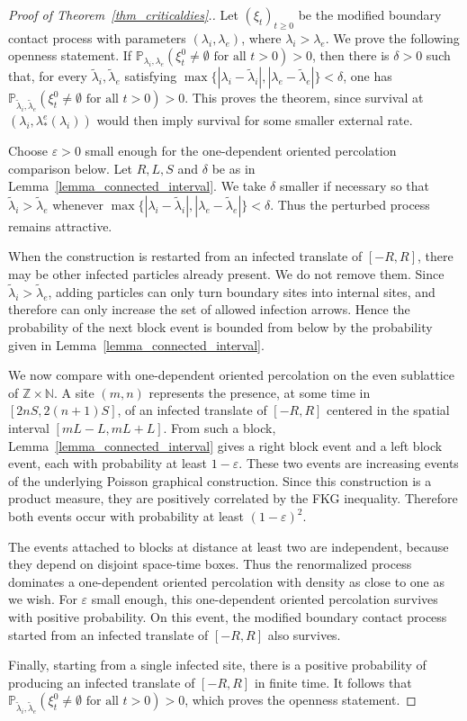 \documentclass[11pt,a4paper]{article}
\theoremstyle{plain}
\theoremstyle{definition}
\theoremstyle{remark}
\numberwithin{equation}{section}
\begin{document}
	\begin{proof}[Proof of Theorem~\ref{thm_criticaldies}.]
		Let $(\xi_t)_{t\geq0}$ be the modified boundary contact process with parameters $(\lambda_i,\lambda_e)$, where $\lambda_i>\lambda_e$. We prove the following openness statement. If $\mathbb{P}_{\lambda_i,\lambda_e}(\xi^0_t\neq\emptyset \text{ for all }t>0)>0$, then there is $\delta>0$ such that, for every $\tilde\lambda_i,\tilde\lambda_e$ satisfying $\max\{|\lambda_i-\tilde\lambda_i|,|\lambda_e-\tilde\lambda_e|\}<\delta$, one has $\mathbb{P}_{\tilde\lambda_i,\tilde\lambda_e}(\xi^0_t\neq\emptyset \text{ for all }t>0)>0$. This proves the theorem, since survival at $(\lambda_i,\lambda^e_*(\lambda_i))$ would then imply survival for some smaller external rate.
		
		Choose $\varepsilon>0$ small enough for the one-dependent oriented percolation comparison below. Let $R,L,S$ and $\delta$ be as in Lemma~\ref{lemma_connected_interval}. We take $\delta$ smaller if necessary so that $\tilde\lambda_i>\tilde\lambda_e$ whenever $\max\{|\lambda_i-\tilde\lambda_i|,|\lambda_e-\tilde\lambda_e|\}<\delta$. Thus the perturbed process remains attractive.
		
		When the construction is restarted from an infected translate of $[-R,R]$, there may be other infected particles already present. We do not remove them. Since $\tilde\lambda_i>\tilde\lambda_e$, adding particles can only turn boundary sites into internal sites, and therefore can only increase the set of allowed infection arrows. Hence the probability of the next block event is bounded from below by the probability given in Lemma~\ref{lemma_connected_interval}.
		
		We now compare with one-dependent oriented percolation on the even sublattice of $\mathbb{Z}\times\mathbb{N}$. A site $(m,n)$ represents the presence, at some time in $[2nS,2(n+1)S]$, of an infected translate of $[-R,R]$ centered in the spatial interval $[mL-L,mL+L]$. From such a block, Lemma~\ref{lemma_connected_interval} gives a right block event and a left block event, each with probability at least $1-\varepsilon$. These two events are increasing events of the underlying Poisson graphical construction. Since this construction is a product measure, they are positively correlated by the FKG inequality. Therefore both events occur with probability at least $(1-\varepsilon)^2$.
		
		The events attached to blocks at distance at least two are independent, because they depend on disjoint space-time boxes. Thus the renormalized process dominates a one-dependent oriented percolation with density as close to one as we wish. For $\varepsilon$ small enough, this one-dependent oriented percolation survives with positive probability. On this event, the modified boundary contact process started from an infected translate of $[-R,R]$ also survives.
		
		Finally, starting from a single infected site, there is a positive probability of producing an infected translate of $[-R,R]$ in finite time. It follows that $\mathbb{P}_{\tilde\lambda_i,\tilde\lambda_e}(\xi^0_t\neq\emptyset \text{ for all }t>0)>0$, which proves the openness statement.
	\end{proof}
	
\end{document}
